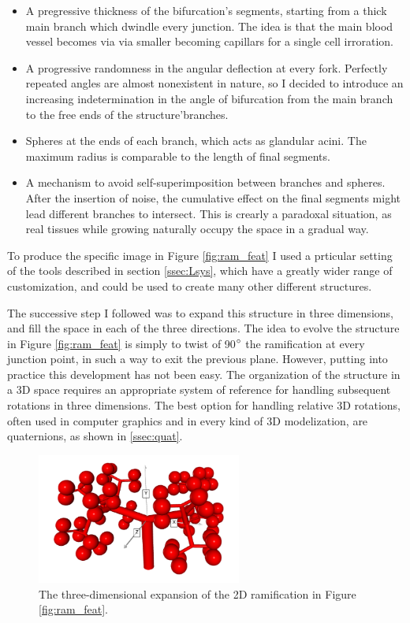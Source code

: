 \begin{itemize}
    \item A pregressive thickness of the bifurcation's segments, starting from a thick main branch which dwindle every junction. The idea is that the main blood vessel becomes via via smaller becoming capillars for a single cell irroration.
    \item A progressive randomness in the angular deflection at every fork. Perfectly repeated angles are almost nonexistent in nature, so I decided to introduce an increasing indetermination in the angle of bifurcation from the main branch to the free ends of the structure'branches.
    \item Spheres at the ends of each branch, which acts as glandular acini. The maximum radius is comparable to the length of final segments.
    \item A mechanism to avoid self-superimposition between branches and spheres. After the insertion of noise, the cumulative effect on the final segments might lead different branches to intersect. This is crearly a paradoxal situation, as real tissues while growing naturally occupy the space in a gradual way.
\end{itemize}

To produce the specific image in Figure \ref{fig:ram_feat} I used a prticular setting of the tools described in section \ref{ssec:Lsys}, which have a greatly wider range of customization, and could be used to create many other different structures.

The successive step I followed was to expand this structure in three dimensions, and fill the space in each of the three directions. The idea to evolve the structure in Figure \ref{fig:ram_feat} is simply to twist of 90$\degree$ the ramification at every junction point, in such a way to exit the previous plane. However, putting into practice this development has not been easy. The organization of the structure in a 3D space requires an appropriate system of reference for handling subsequent rotations in three dimensions. The best option for handling relative 3D rotations, often used in computer graphics and in every kind of 3D modelization, are quaternions, as shown in \ref{ssec:quat}.

\begin{figure}
    \centering
    \includegraphics[width = 0.6\textwidth]{images/3d_ram}
    \caption{The three-dimensional expansion of the 2D ramification in Figure \ref{fig:ram_feat}.}
    \label{fig:3d_ram}
\end{figure}

